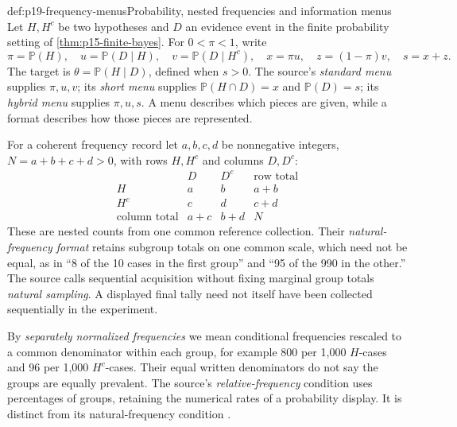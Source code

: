 \begin{hbdefinition}{def:p19-frequency-menus}{Probability, nested frequencies and information menus}
Let \(H,H^c\) be two hypotheses and \(D\) an evidence event in the finite
probability setting of \cref{thm:p15-finite-bayes}. For \(0<\pi<1\), write
\[
 \pi=\mathbb P(H),\quad u=\mathbb P(D\mid H),\quad
 v=\mathbb P(D\mid H^c),\quad
 x=\pi u,\quad z=(1-\pi)v,\quad s=x+z.
\]
The target is \(\theta=\mathbb P(H\mid D)\), defined when \(s>0\).
The source's \emph{standard menu} supplies \(\pi,u,v\); its \emph{short
menu} supplies \(\mathbb P(H\cap D)=x\) and \(\mathbb P(D)=s\); its
\emph{hybrid menu} supplies \(\pi,u,s\). A menu describes which pieces
are given, while a format describes how those pieces are represented.

For a coherent frequency record let \(a,b,c,d\) be nonnegative integers,
\(N=a+b+c+d>0\), with rows \(H,H^c\) and columns \(D,D^c\):
\[
\begin{array}{c|cc|c}
 &D&D^c&\text{row total}\\\hline
H&a&b&a+b\\
H^c&c&d&c+d\\\hline
\text{column total}&a+c&b+d&N
\end{array}
\]
These are nested counts from one common reference collection. Their
\emph{natural-frequency format} retains subgroup totals on one common scale,
which need not be equal,
as in ``8 of the 10 cases in the first group'' and ``95 of the 990 in
the other.'' The source calls sequential acquisition without fixing marginal
group totals \emph{natural sampling}. A displayed final tally need not
itself have been collected sequentially in the experiment.

By \emph{separately normalized frequencies} we mean conditional frequencies
rescaled to a common denominator within each group, for example 800 per
1,000 \(H\)-cases and 96 per 1,000 \(H^c\)-cases. Their equal written
denominators do not say the groups are equally prevalent. The source's
\emph{relative-frequency} condition uses percentages of groups, retaining
the numerical rates of a probability display. It is distinct from its
natural-frequency condition \cite[pp.~686--689]{GigerenzerHoffrage1995FrequencyFormats}.
\end{hbdefinition}


